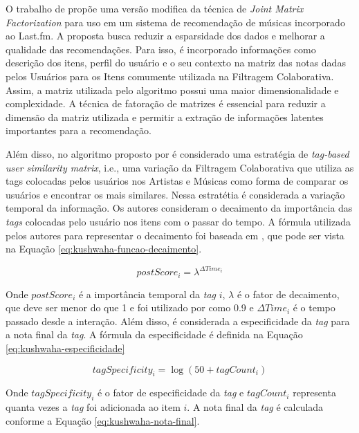 O trabalho de  propõe uma versão modifica da técnica de \textit{Joint Matrix Factorization}
para uso em um sistema de recomendação de músicas incorporado ao Last.fm. A proposta busca reduzir a esparsidade dos
dados e melhorar a qualidade das recomendações. Para isso, é incorporado informações como descrição dos itens, perfil
do usuário e o seu contexto na matriz das notas dadas pelos Usuários para os Itens comumente utilizada na Filtragem
Colaborativa. Assim, a matriz utilizada pelo algoritmo possui uma maior dimensionalidade e complexidade. A técnica de fatoração de
matrizes é essencial para reduzir a dimensão da matriz utilizada e permitir a extração de informações latentes importantes para a
recomendação.

Além disso, no algoritmo proposto por  é considerado uma estratégia de \textit{tag-based
user similarity matrix}, i.e., uma variação da Filtragem Colaborativa que utiliza as tags colocadas pelos usuários nos Artistas
e Músicas como forma de comparar os usuários e encontrar os mais similares. Nessa estratétia é considerada a variação
temporal da informação. Os autores consideram o decaimento da importância das \textit{tags} colocadas pelo usuário nos
itens com o passar do tempo. A fórmula utilizada pelos autores para representar o decaimento foi baseada em
, que pode ser vista na Equação \ref{eq:kushwaha-funcao-decaimento}.

\begin{equation}
  \label{eq:kushwaha-funcao-decaimento}
  postScore_i = \lambda^{\Delta Time_i}
\end{equation}

Onde $postScore_i$ é a importância temporal da \textit{tag} $i$, $\lambda$ é o fator de decaimento, que deve ser menor do que 1
e foi utilizado por  como 0.9 e $\Delta Time_i$ é o tempo passado desde a interação. Além disso,
é considerada a especificidade da \textit{tag} para a nota final da \textit{tag}. A fórmula da especificidade é definida
na Equação \ref{eq:kushwaha-especificidade}

\begin{equation}
  \label{eq:kushwaha-especificidade}
  tagSpecificity_i = \log(50+tagCount_i)
\end{equation}

Onde $tagSpecificity_i$ é o fator de especificidade da \textit{tag} e $tagCount_i$ representa quanta vezes a \textit{tag} foi adicionada
ao item $i$. A nota final da \textit{tag} é calculada conforme a Equação \ref{eq:kushwaha-nota-final}.

